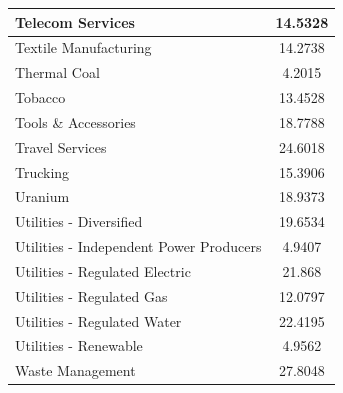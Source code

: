 \documentclass{article}
\begin{document}
\begin{xtabular}{|l|c|}
Telecom Services & 14.5328\\ \hline
Textile Manufacturing & 14.2738\\ \hline
Thermal Coal & 4.2015\\ \hline
Tobacco & 13.4528\\ \hline
Tools \& Accessories & 18.7788\\ \hline
Travel Services & 24.6018\\ \hline
Trucking & 15.3906\\ \hline
Uranium & 18.9373\\ \hline
Utilities - Diversified & 19.6534\\ \hline
Utilities - Independent Power Producers & 4.9407\\ \hline
Utilities - Regulated Electric & 21.868\\ \hline
Utilities - Regulated Gas & 12.0797\\ \hline
Utilities - Regulated Water & 22.4195\\ \hline
Utilities - Renewable & 4.9562\\ \hline
Waste Management & 27.8048\\ \hline
\end{xtabular} 
\end{document}
